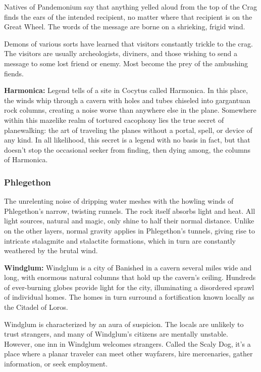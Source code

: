 Natives of Pandemonium say that anything yelled aloud from the top of the Crag finds the ears of the intended recipient, no matter where that recipient is on the Great Wheel. The words of the message are borne on a shrieking, frigid wind.

Demons of various sorts have learned that visitors constantly trickle to the crag. The visitors are usually archeologists, diviners, and those wishing to send a message to some lost friend or enemy. Most become the prey of the ambushing fiends.

\textbf{Harmonica:} Legend tells of a site in Cocytus called Harmonica. In this place, the winds whip through a cavern with holes and tubes chiseled into gargantuan rock columns, creating a noise worse than anywhere else in the plane. Somewhere within this mazelike realm of tortured cacophony lies the true secret of planewalking: the art of traveling the planes without a portal, spell, or device of any kind. In all likelihood, this secret is a legend with no basis in fact, but that doesn't stop the occasional seeker from finding, then dying among, the columns of Harmonica.

\subsubsection{Phlegethon}
The unrelenting noise of dripping water meshes with the howling winds of Phlegethon's narrow, twisting runnels. The rock itself absorbs light and heat. All light sources, natural and magic, only shine to half their normal distance. Unlike on the other layers, normal gravity applies in Phlegethon's tunnels, giving rise to intricate stalagmite and stalactite formations, which in turn are constantly weathered by the brutal wind.

\textbf{Windglum:} Windglum is a city of Banished in a cavern several miles wide and long, with enormous natural columns that hold up the cavern's ceiling. Hundreds of ever-burning globes provide light for the city, illuminating a disordered sprawl of individual homes. The homes in turn surround a fortification known locally as the Citadel of Loros.

Windglum is characterized by an aura of suspicion. The locals are unlikely to trust strangers, and many of Windglum's citizens are mentally unstable. However, one inn in Windglum welcomes strangers. Called the Scaly Dog, it's a place where a planar traveler can meet other wayfarers, hire mercenaries, gather information, or seek employment.

